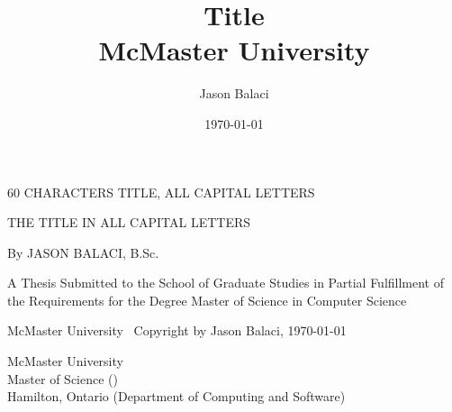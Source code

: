 \documentclass[12pt,oneside]{book}
\title{
    {Title}\\
    {McMaster University}
}
\author{Jason Balaci}
\date{\today}
\begin{document}
\frontmatter

\setlength{\marginparwidth}{3.5cm}
\reversemarginpar %
\todototoc
\listoftodos
\newpage



\null %
\vspace{0.25\textheight}

\begin{center}
  60 CHARACTERS TITLE, ALL CAPITAL LETTERS
\end{center}

\newpage


\null
\vspace{0.2\textheight}

\begin{center}
  THE TITLE IN ALL CAPITAL LETTERS

  \vspace{2cm}

  By JASON BALACI, B.Sc.

  \vfill

  A Thesis Submitted to the School of Graduate Studies in Partial Fulfillment of the Requirements for the Degree Master of Science in Computer Science

  \vspace{2cm}

  McMaster University \textcopyright\ Copyright by Jason Balaci, \today

\end{center}

\newpage


\setcounter{page}{2} %

\noindent
McMaster University \\
Master of Science (\the\year{}) \\
Hamilton, Ontario (Department of Computing and Software)
\end{document}
